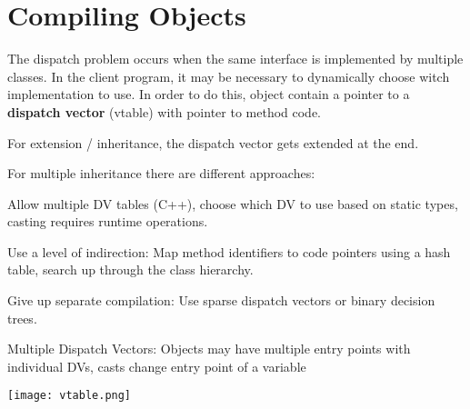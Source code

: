 \section*{Compiling Objects}

The dispatch problem occurs when the same interface is implemented by multiple classes. In the client program, it may be necessary to dynamically choose witch implementation to use. In order to do this, object contain a pointer to a \textbf{dispatch vector} (vtable) with pointer to method code. \medskip

For extension / inheritance, the dispatch vector gets extended at the end.\medskip
	
For multiple inheritance there are different approaches: 
\begin{compactitem}
	\item Allow multiple DV tables (C++), choose which DV to use based on static types, casting requires runtime operations.
			
	\item Use a level of indirection: Map method identifiers to code pointers using a hash table, search up through the class hierarchy.
			
	\item Give up separate compilation: Use sparse dispatch vectors or binary decision trees.
\end{compactitem}
	
Multiple Dispatch Vectors: Objects may have multiple entry points with individual DVs, casts change entry point of a variable
\vspace{-8pt}
\begin{center}
	\texttt{[image: vtable.png]}
\end{center}
\vspace{-20pt}